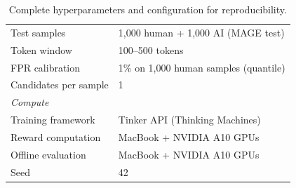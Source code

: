 \documentclass{article} %
\begin{document}
\begin{table}[!ht]
\begin{tabular}{ll}
Test samples & 1,000 human + 1,000 AI (MAGE test) \\
Token window & 100--500 tokens \\
FPR calibration & 1\% on 1,000 human samples (quantile) \\
Candidates per sample & 1 \\
\midrule
\multicolumn{2}{l}{\textit{Compute}} \\
Training framework & Tinker API (Thinking Machines) \\
Reward computation & MacBook + NVIDIA A10 GPUs \\
Offline evaluation & MacBook + NVIDIA A10 GPUs \\
Seed & 42 \\
\bottomrule
\end{tabular}
\caption{Complete hyperparameters and configuration for reproducibility.}
\end{table}
\end{document}
